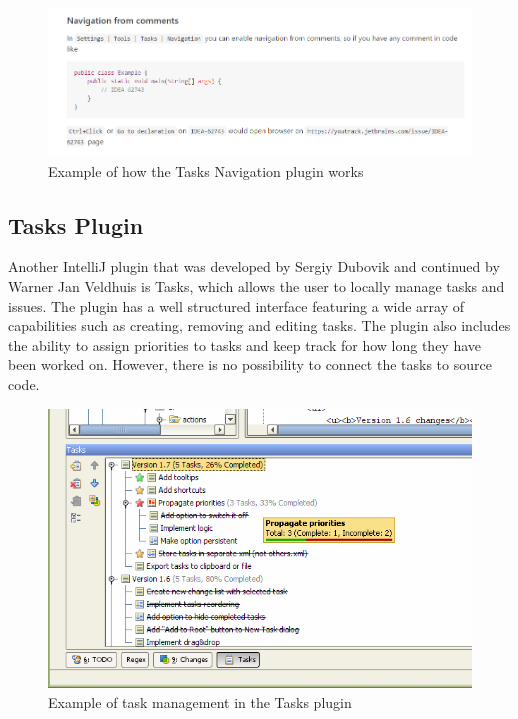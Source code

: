\documentclass{4thYearProject}
\begin{document}
\begin{figure}[H]
\includegraphics[scale=0.6]{Tasks_Navigation_Plugin}
\centering
\caption{Example of how the Tasks Navigation plugin works}\label{tasksnavigation}
\label{fig:tasksnavigation}
\end{figure}

\subsection{Tasks Plugin}

Another IntelliJ plugin that was developed by Sergiy Dubovik and continued by Warner Jan Veldhuis is Tasks, which allows the user to locally manage tasks and issues. The plugin has a well structured interface featuring a wide array of capabilities such as creating, removing and editing tasks. The plugin also includes the ability to assign priorities to tasks and keep track for how long they have been worked on. However, there is no possibility to connect the tasks to source code. 

\begin{figure}[H]
\includegraphics[scale=0.6]{Tasks}
\centering
\caption{Example of task management in the Tasks plugin}\label{tasks}
\label{fig:tasks}
\end{figure}
\end{document}
